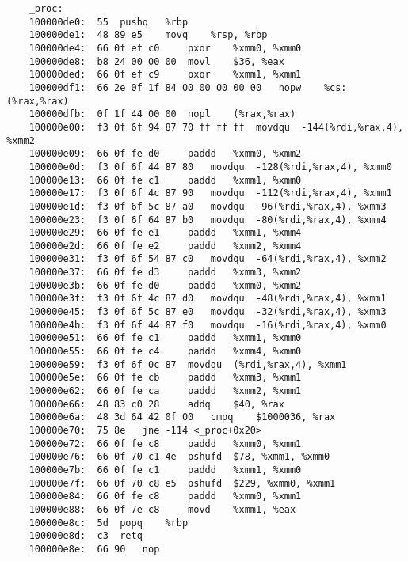\documentclass[a4paper]{article}
\begin{document}
\begin{lstlisting}
    _proc:
    100000de0:	55 	pushq	%rbp
    100000de1:	48 89 e5 	movq	%rsp, %rbp
    100000de4:	66 0f ef c0 	pxor	%xmm0, %xmm0
    100000de8:	b8 24 00 00 00 	movl	$36, %eax
    100000ded:	66 0f ef c9 	pxor	%xmm1, %xmm1
    100000df1:	66 2e 0f 1f 84 00 00 00 00 00 	nopw	%cs:(%rax,%rax)
    100000dfb:	0f 1f 44 00 00 	nopl	(%rax,%rax)
    100000e00:	f3 0f 6f 94 87 70 ff ff ff 	movdqu	-144(%rdi,%rax,4), %xmm2
    100000e09:	66 0f fe d0 	paddd	%xmm0, %xmm2
    100000e0d:	f3 0f 6f 44 87 80 	movdqu	-128(%rdi,%rax,4), %xmm0
    100000e13:	66 0f fe c1 	paddd	%xmm1, %xmm0
    100000e17:	f3 0f 6f 4c 87 90 	movdqu	-112(%rdi,%rax,4), %xmm1
    100000e1d:	f3 0f 6f 5c 87 a0 	movdqu	-96(%rdi,%rax,4), %xmm3
    100000e23:	f3 0f 6f 64 87 b0 	movdqu	-80(%rdi,%rax,4), %xmm4
    100000e29:	66 0f fe e1 	paddd	%xmm1, %xmm4
    100000e2d:	66 0f fe e2 	paddd	%xmm2, %xmm4
    100000e31:	f3 0f 6f 54 87 c0 	movdqu	-64(%rdi,%rax,4), %xmm2
    100000e37:	66 0f fe d3 	paddd	%xmm3, %xmm2
    100000e3b:	66 0f fe d0 	paddd	%xmm0, %xmm2
    100000e3f:	f3 0f 6f 4c 87 d0 	movdqu	-48(%rdi,%rax,4), %xmm1
    100000e45:	f3 0f 6f 5c 87 e0 	movdqu	-32(%rdi,%rax,4), %xmm3
    100000e4b:	f3 0f 6f 44 87 f0 	movdqu	-16(%rdi,%rax,4), %xmm0
    100000e51:	66 0f fe c1 	paddd	%xmm1, %xmm0
    100000e55:	66 0f fe c4 	paddd	%xmm4, %xmm0
    100000e59:	f3 0f 6f 0c 87 	movdqu	(%rdi,%rax,4), %xmm1
    100000e5e:	66 0f fe cb 	paddd	%xmm3, %xmm1
    100000e62:	66 0f fe ca 	paddd	%xmm2, %xmm1
    100000e66:	48 83 c0 28 	addq	$40, %rax
    100000e6a:	48 3d 64 42 0f 00 	cmpq	$1000036, %rax
    100000e70:	75 8e 	jne	-114 <_proc+0x20>
    100000e72:	66 0f fe c8 	paddd	%xmm0, %xmm1
    100000e76:	66 0f 70 c1 4e 	pshufd	$78, %xmm1, %xmm0
    100000e7b:	66 0f fe c1 	paddd	%xmm1, %xmm0
    100000e7f:	66 0f 70 c8 e5 	pshufd	$229, %xmm0, %xmm1
    100000e84:	66 0f fe c8 	paddd	%xmm0, %xmm1
    100000e88:	66 0f 7e c8 	movd	%xmm1, %eax
    100000e8c:	5d 	popq	%rbp
    100000e8d:	c3 	retq
    100000e8e:	66 90 	nop


\end{lstlisting}
\end{document}
